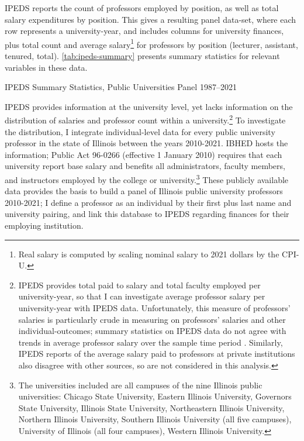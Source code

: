 IPEDS reports the count of professors employed by position, as well as total salary expenditures by position.
This gives a resulting panel data-set, where each row represents a university-year, and includes columns for university finances, plus total count and average salary\footnote{
    Real salary is computed by scaling nominal salary to 2021 dollars by the CPI-U.
} for professors by position (lecturer, assistant, tenured, total).
\autoref{tab:ipeds-summary} presents summary statistics for relevant variables in these data.

\begin{table}[h!]
    \singlespacing
    \caption{IPEDS Summary Statistics, Public Universities Panel 1987--2021}
    \makebox[\textwidth][c]{}
    \label{tab:ipeds-summary}
\end{table}

IPEDS provides information at the university level, yet lacks information on the distribution of salaries and professor count within a university.\footnote{
    IPEDS provides total paid to salary and total faculty employed per university-year, so that I can investigate average professor salary per university-year with IPEDS data.
    Unfortunately, this measure of professors' salaries is particularly crude in measuring on professors' salaries and other individual-outcomes; summary statistics on IPEDS data do not agree with trends in average professor salary over the sample time period \citep{aau2021survey}.
    Similarly, IPEDS reports of the average salary paid to professors at private institutions also disagree with other sources, so are not considered in this analysis.
}
To investigate the distribution, I integrate individual-level data for every public university professor in the state of Illinois between the years 2010-2021.
IBHED hosts the information;
Public Act 96-0266 (effective 1 January 2010) requires that each university report base salary and benefits all administrators, faculty members, and instructors employed by the college or university.\footnote{
    The universities included are all campuses of the nine Illinois public universities: Chicago State University, Eastern Illinois University, Governors State University, Illinois State University, Northeastern Illinois University, Northern Illinois University, Southern Illinois University  (all five campuses), University of Illinois (all four campuses), Western Illinois University.
}
These publicly available data provides the basis to build a panel of Illinois public university professors 2010-2021; I define a professor as an individual by their first plus last name and university pairing, and link this database to IPEDS regarding finances for their employing institution.

